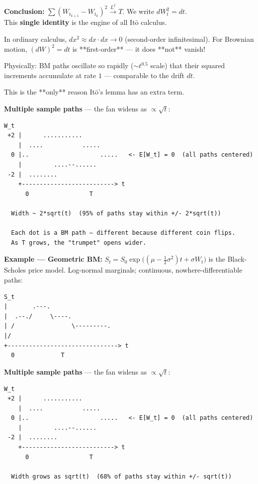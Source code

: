 \documentclass[11pt,a4paper]{article}
\begin{document}
\textbf{Conclusion:} \(\sum (W_{t_{k+1}}-W_{t_k})^2 \xrightarrow{L^2} T\). We write \(dW_t^2 = dt\).\\
This \textbf{single identity} is the engine of all Itō calculus.

\begin{tcolorbox}[colback=thmbg!60,colframe=optgold,fonttitle=\bfseries\sffamily,title={\textsf{\textbf{Theorem / Key Idea}} — Why dW² = dt is remarkable},breakable]
In ordinary calculus, $dx^2 \approx dx \cdot dx \to 0$ (second-order infinitesimal).  
For Brownian motion, $(dW)^2 = dt$ is **first-order** — it does **not** vanish!

Physically: BM paths oscillate so rapidly ($\sim t^{0.5}$ scale) that their squared 
increments accumulate at rate $1$ — comparable to the drift $dt$.

This is the **only** reason Itō's lemma has an extra term.
\end{tcolorbox}

\textbf{Multiple sample paths} --- the fan widens as \(\propto\sqrt{t}\):

\begin{verbatim}
W_t
 +2 |      ...........
    |  ....           .....
  0 |..                    .....   <- E[W_t] = 0  (all paths centered)
    |         ....--......
 -2 |  ........
    +--------------------------> t
      0                 T

  Width ~ 2*sqrt(t)  (95% of paths stay within +/- 2*sqrt(t))
  
  Each dot is a BM path — different because different coin flips.
  As T grows, the "trumpet" opens wider.
\end{verbatim}

\textbf{Example --- Geometric BM:} \(S_t = S_0 \exp\!\bigl((\mu-\tfrac12\sigma^2)t + \sigma W_t\bigr)\) is the Black-Scholes price model. Log-normal marginals; continuous, nowhere-differentiable paths:

\begin{verbatim}
S_t
|       .---.
|  .--./     \----.
| /                \---------.
|/
+-------------------------------> t
  0             T
\end{verbatim}

\textbf{Multiple sample paths} --- the fan widens as \(\propto\sqrt{t}\):

\begin{verbatim}
W_t
 +2 |      ...........
    |  ....           .....
  0 |..                    .....   <- E[W_t] = 0  (all paths centered)
    |         ....--......
 -2 |  ........
    +--------------------------> t
      0                 T

  Width grows as sqrt(t)  (68% of paths stay within +/- sqrt(t))
\end{verbatim}
\end{document}
